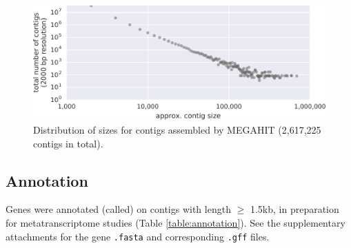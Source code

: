 \begin{figure}[H]
\centering
    \includegraphics[width=1.0\textwidth]{./tex/chapter2/figures/170123_frac_reads_binned_at_different_contig_lengths_and_total--INKSCAPED.pdf}
    \begin{singlespace}
    \caption[Distribution of contig sizes]{
        Distribution of sizes for contigs assembled by MEGAHIT (2,617,225 contigs in total).}
    \label{fig:contig_lengths}
    \end{singlespace}
\end{figure}



\subsection{Annotation}



Genes were annotated (called) on contigs with length $\geq$ 1.5kb, in preparation for metatranscriptome studies (Table \ref{table:annotation}).
See the supplementary attachments for the gene \texttt{.fasta} and corresponding \texttt{.gff} files. %

